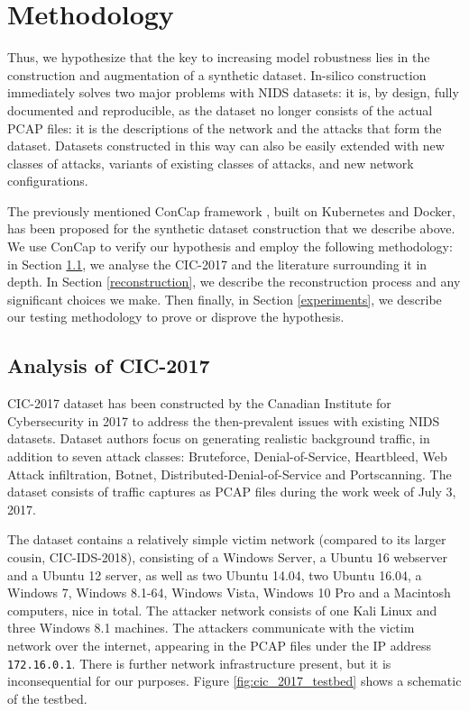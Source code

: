 \section{Methodology}

Thus, we hypothesize that the key to increasing model robustness lies in the construction and augmentation of a synthetic dataset. In-silico construction immediately solves two major problems with NIDS datasets: it is, by design, fully documented and reproducible, as the dataset no longer consists of the actual PCAP files: it is the descriptions of the network and the attacks that form the dataset. Datasets constructed in this way can also be easily extended with new classes of attacks, variants of existing classes of attacks, and new network configurations. 

The previously mentioned ConCap framework \cite{concap}, built on Kubernetes and Docker, has been proposed for the synthetic dataset construction that we describe above. We use ConCap to verify our hypothesis and employ the following methodology: in Section \ref{cic_analysis}, we analyse the CIC-2017 and the literature surrounding it in depth. In Section \ref{reconstruction}, we describe the reconstruction process and any significant choices we make. Then finally, in Section \ref{experiments}, we describe our testing methodology to prove or disprove the hypothesis.

\subsection{Analysis of CIC-2017}\label{cic_analysis}
CIC-2017 dataset has been constructed by the Canadian Institute for Cybersecurity in 2017 to address the then-prevalent issues with existing NIDS datasets. Dataset authors focus on generating realistic background traffic, in addition to seven attack classes: Bruteforce, Denial-of-Service, Heartbleed, Web Attack infiltration, Botnet, Distributed-Denial-of-Service and Portscanning. The dataset consists of traffic captures as PCAP files during the work week of July 3, 2017. 

The dataset contains a relatively simple victim network (compared to its larger cousin, CIC-IDS-2018), consisting of a Windows Server, a Ubuntu 16 webserver and a Ubuntu 12 server, as well as two Ubuntu 14.04, two Ubuntu 16.04, a Windows 7, Windows 8.1-64, Windows Vista, Windows 10 Pro and a Macintosh computers, nice in total. The attacker network consists of one Kali Linux and three Windows 8.1 machines. The attackers communicate with the victim network over the internet, appearing in the PCAP files under the IP address \texttt{172.16.0.1}. There is further network infrastructure present, but it is inconsequential for our purposes. Figure \ref{fig:cic_2017_testbed} \cite{cic_2017} shows a schematic of the testbed.

